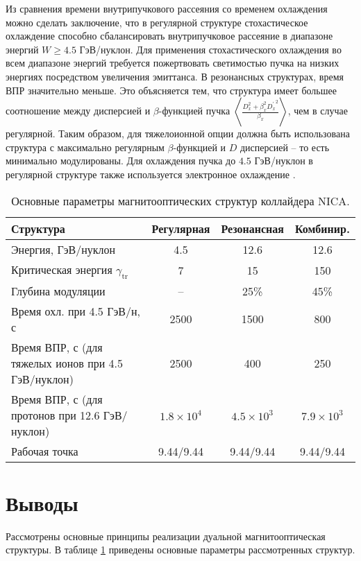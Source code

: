 \noindent Из сравнения времени внутрипучкового рассеяния со временем охлаждения можно сделать заключение, что в регулярной структуре стохастическое охлаждение способно сбалансировать внутрипучковое рассеяние в диапазоне энергий $W\geq4.5$ ГэВ/нуклон. Для применения стохастического охлаждения во всем диапазоне энергий требуется пожертвовать светимостью пучка на низких энергиях посредством увеличения эмиттанса. В резонансных структурах, время ВПР значительно меньше. Это объясняется тем, что структура имеет большее соотношение между дисперсией и $\beta$-функцией пучка $\left\langle\frac{D_x^2+\beta_x^2{D_x^\prime}^2}{\beta_x}\right\rangle$, чем в случае регулярной. Таким образом, для тяжелоионной опции должна быть использована структура с максимально регулярным $\beta$-функцией и $D$ дисперсией -- то есть минимально модулированы. Для охлаждения пучка до $4.5$ ГэВ/нуклон в регулярной структуре также используется электронное охлаждение \cite{kostromin:stochastic}.

\begin{table}[h!]
	\centering
	\begin{tabular}{|l|c|c|c|}
		\hline
		\textbf{Структура} & \textbf{Регулярная} & \textbf{Резонансная} & \textbf{Комбинир.} \\
		\hline
		Энергия, ГэВ/нуклон & 4.5 & 12.6 & 12.6 \\
		\hline
		Критическая энергия $\gamma_{\text{tr}}$ & 7 & 15 & 150 \\
		\hline
		Глубина модуляции & -- & 25\% & 45\% \\
		\hline
		Время охл. при 4.5 ГэВ/н, с & 2500 & 1500 & 800 \\
		\hline
		\parbox{7cm}{Время ВПР, с (для тяжелых ионов при 4.5 ГэВ/нуклон)} & 2500 & 400 & 250 \\
		\hline
		\parbox{7cm}{Время ВПР, с (для протонов при 12.6 ГэВ/нуклон)} & $1.8 \times 10^4$ & $4.5 \times 10^3$ & $7.9 \times 10^3$ \\
		\hline
		Рабочая точка & 9.44/9.44 & 9.44/9.44 & 9.44/9.44 \\
		\hline
	\end{tabular}
	\caption{Основные параметры магнитооптических структур коллайдера NICA.}
	\label{tab:dual}
\end{table}

\section*{Выводы}
\par Рассмотрены основные принципы реализации дуальной магнитооптическая структуры. 
В таблице \ref{tab:dual} приведены основные параметры рассмотренных структур.

